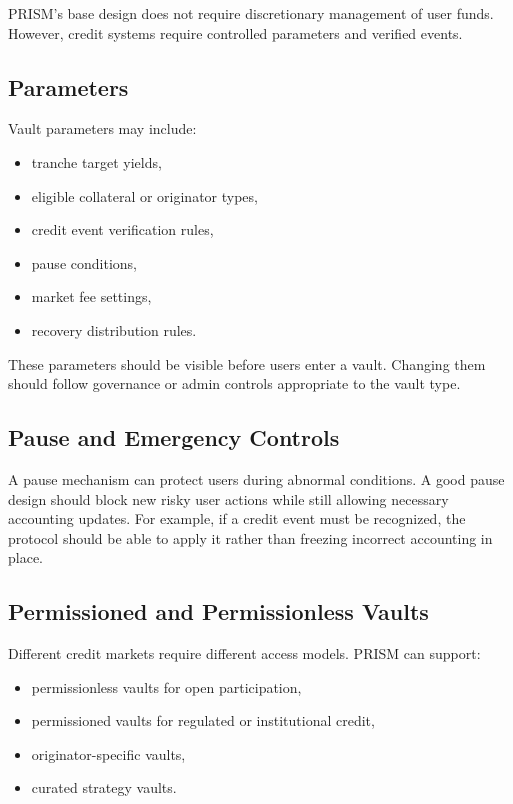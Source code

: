\documentclass[11pt]{article}
\begin{document}
PRISM's base design does not require discretionary management of user funds.
However, credit systems require controlled parameters and verified events.

\subsection{Parameters}

Vault parameters may include:

\begin{itemize}
  \item tranche target yields,
  \item eligible collateral or originator types,
  \item credit event verification rules,
  \item pause conditions,
  \item market fee settings,
  \item recovery distribution rules.
\end{itemize}

These parameters should be visible before users enter a vault. Changing them
should follow governance or admin controls appropriate to the vault type.

\subsection{Pause and Emergency Controls}

A pause mechanism can protect users during abnormal conditions. A good pause
design should block new risky user actions while still allowing necessary
accounting updates. For example, if a credit event must be recognized, the
protocol should be able to apply it rather than freezing incorrect accounting in
place.

\subsection{Permissioned and Permissionless Vaults}

Different credit markets require different access models. PRISM can support:

\begin{itemize}
  \item permissionless vaults for open participation,
  \item permissioned vaults for regulated or institutional credit,
  \item originator-specific vaults,
  \item curated strategy vaults.
\end{itemize}
\end{document}
